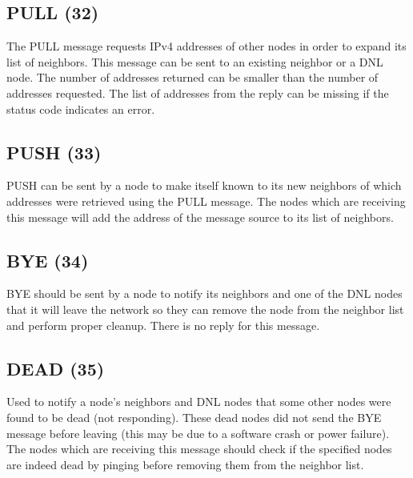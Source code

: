 \subsection{PULL (32)}

The PULL message requests IPv4 addresses of other nodes in order to expand its
list of neighbors. This message can be sent to an existing neighbor or a DNL
node. The number of addresses returned can be smaller than the number of
addresses requested. The list of addresses from the reply can be missing if the
status code indicates an error.

\begin{figure}[H]
    \centering
\end{figure}

\subsection{PUSH (33)}

PUSH can be sent by a node to make itself known to its new neighbors of which
addresses were retrieved using the PULL message. The nodes which are receiving
this message will add the address of the message source to its list of
neighbors.

\subsection{BYE (34)}

BYE should be sent by a node to notify its neighbors and one of the DNL nodes
that it will leave the network so they can remove the node from the neighbor
list and perform proper cleanup. There is no reply for this message.

\subsection{DEAD (35)}

Used to notify a node's neighbors and DNL nodes that some other nodes were 
found to be dead (not responding). These dead nodes did not send the BYE 
message before leaving (this may be due to a software crash or power failure). 
The nodes which are receiving this message should check if the specified nodes
are indeed dead by pinging before removing them from the neighbor list.

